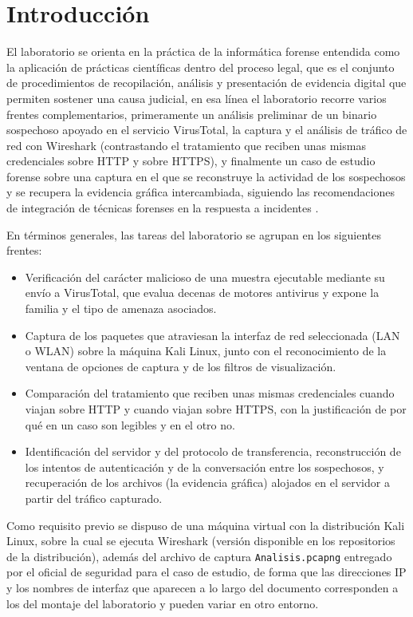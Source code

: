 \section*{Introducción}

El laboratorio se orienta en la práctica de la informática forense entendida como la aplicación de prácticas científicas dentro del proceso legal, que es el conjunto de procedimientos de recopilación, análisis y presentación de evidencia digital que permiten sostener una causa judicial, en esa línea el laboratorio recorre varios frentes complementarios, primeramente un análisis preliminar de un binario sospechoso apoyado en el servicio VirusTotal, la captura y el análisis de tráfico de red con Wireshark \cite{wireshark-guide} (contrastando el tratamiento que reciben unas mismas credenciales sobre HTTP y sobre HTTPS), y finalmente un caso de estudio forense sobre una captura en el que se reconstruye la actividad de los sospechosos y se recupera la evidencia gráfica intercambiada, siguiendo las recomendaciones de integración de técnicas forenses en la respuesta a incidentes \cite{nist80086}.

En términos generales, las tareas del laboratorio se agrupan en los siguientes frentes:

\begin{itemize}
  \item {} Verificación del carácter malicioso de una muestra ejecutable mediante su envío a VirusTotal, que evalua decenas de motores antivirus y expone la familia y el tipo de amenaza asociados.
  \item {} Captura de los paquetes que atraviesan la interfaz de red seleccionada (LAN o WLAN) sobre la máquina Kali Linux, junto con el reconocimiento de la ventana de opciones de captura y de los filtros de visualización.
  \item {} Comparación del tratamiento que reciben unas mismas credenciales cuando viajan sobre HTTP y cuando viajan sobre HTTPS, con la justificación de por qué en un caso son legibles y en el otro no.
  \item {} Identificación del servidor y del protocolo de transferencia, reconstrucción de los intentos de autenticación y de la conversación entre los sospechosos, y recuperación de los archivos (la evidencia gráfica) alojados en el servidor a partir del tráfico capturado.
\end{itemize}

Como requisito previo se dispuso de una máquina virtual con la distribución Kali Linux, sobre la cual se ejecuta Wireshark (versión disponible en los repositorios de la distribución), además del archivo de captura \texttt{Analisis.pcapng} entregado por el oficial de seguridad para el caso de estudio, de forma que las direcciones IP y los nombres de interfaz que aparecen a lo largo del documento corresponden a los del montaje del laboratorio y pueden variar en otro entorno.
